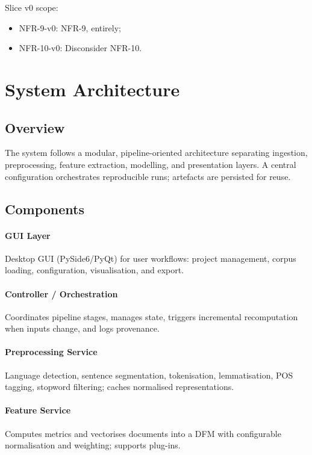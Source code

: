 Slice v0 scope:

\begin{itemize}
    \item NFR-9-v0: NFR-9, entirely;
    \item NFR-10-v0: Disconsider NFR-10.
\end{itemize}

\section{System Architecture}

\subsection{Overview}

The system follows a modular, pipeline-oriented architecture separating ingestion, preprocessing, feature extraction, modelling, and presentation layers. A central configuration orchestrates reproducible runs; artefacts are persisted for reuse.

\subsection{Components}

\paragraph{GUI Layer}
Desktop GUI (PySide6/PyQt) for user workflows: project management, corpus loading, configuration, visualisation, and export.

\paragraph{Controller / Orchestration}
Coordinates pipeline stages, manages state, triggers incremental recomputation when inputs change, and logs provenance.

\paragraph{Preprocessing Service}
Language detection, sentence segmentation, tokenisation, lemmatisation, POS tagging, stopword filtering; caches normalised representations.

\paragraph{Feature Service}
Computes metrics and vectorises documents into a DFM with configurable normalisation and weighting; supports plug-ins.


